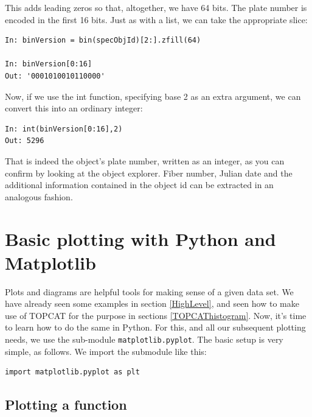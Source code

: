 \documentclass[twocolumn,apj]{openjournal}
\begin{document}
This adds leading zeros so that, altogether, we have 64 bits. The plate number is encoded in the first 16 bits. Just as with a list, we can take the appropriate slice:
\begin{lstlisting}
In: binVersion = bin(specObjId)[2:].zfill(64)

In: binVersion[0:16]
Out: '0001010010110000'
\end{lstlisting}
Now, if we use the int function, specifying base 2 as an extra argument, we can convert this into an ordinary integer:
\begin{lstlisting}
In: int(binVersion[0:16],2)
Out: 5296
\end{lstlisting}
That is indeed the object's plate number, written as an integer, as you can confirm by looking at the object explorer. Fiber number, Julian date and the additional information contained in the object id can be extracted in an analogous fashion.

\section{Basic plotting with Python and Matplotlib}

Plots and diagrams are helpful tools for making sense of a given data set. We have already seen some examples in section \ref{HighLevel}, and seen how to make use of TOPCAT for the purpose in sections
\ref{TOPCAThistogram}. Now, it's time to learn how to do the same in Python. For this, and all our subsequent plotting needs, we use the sub-module \verb|matplotlib.pyplot|. The basic setup is very simple, as follows. We import the submodule like this:
\begin{lstlisting}
import matplotlib.pyplot as plt
\end{lstlisting}

\subsection{Plotting a function}
\end{document}
